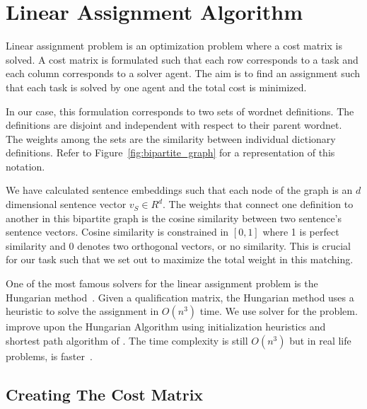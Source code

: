 \section{Linear Assignment Algorithm}%
\label{sec:linear_assignment_algorithm}

Linear assignment problem is an optimization problem where a cost matrix is solved.
A cost matrix is formulated such that each row corresponds to a task and each column corresponds to a solver agent.
The aim is to find an assignment such that each task is solved by one agent and the total cost is minimized.

In our case, this formulation corresponds to two sets of wordnet definitions.
The definitions are disjoint and independent with respect to their parent wordnet.
The weights among the sets are the similarity between individual dictionary definitions.
Refer to Figure~\ref{fig:bipartite_graph} for a representation of this notation.

We have calculated sentence embeddings such that each node of the graph is an $d$ dimensional sentence vector $v_S \in R^{d}$.
The weights that connect one definition to another in this bipartite graph is the cosine similarity between two sentence's sentence vectors.
Cosine similarity is constrained in $[0,1]$ where 1 is perfect similarity and 0 denotes two orthogonal vectors, or no similarity.
This is crucial for our task such that we set out to maximize the total weight in this matching.

One of the most famous solvers for the linear assignment problem is the Hungarian method~\cite{kuhn_hungarian_1955}.
Given a qualification matrix, the Hungarian method uses a heuristic to solve the assignment in $O(n^3)$ time.
We use \textcite{jonker_shortest_1987} solver for the problem.
\citeauthor{jonker_shortest_1987} improve upon the Hungarian Algorithm using initialization heuristics and shortest path algorithm of \textcite{dijkstra_note_1959}.
The time complexity is still $O(n^3)$ but in real life problems, \citeauthor{jonker_shortest_1987} is faster~\cite{ruder_discriminative_2018}.

\subsection{Creating The Cost Matrix}%
\label{sub:creating_the_cost_matrix}

